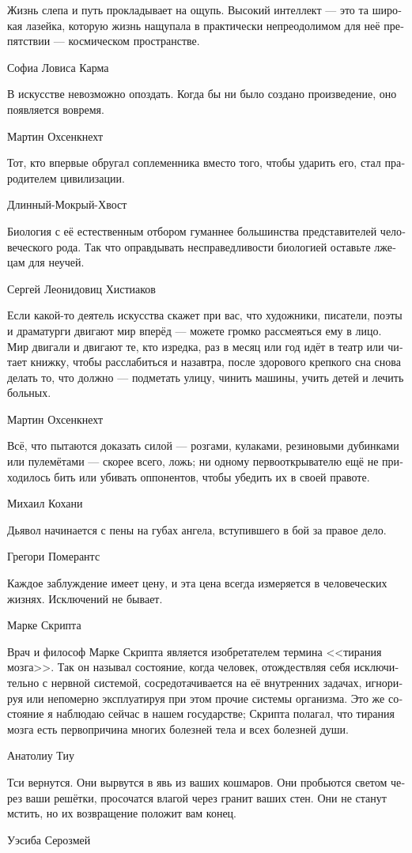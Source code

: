 \documentclass[a4paper,12pt,fleqn]{book}\usepackage{polyglossia}\setdefaultlanguage[babelshorthands=true]{russian}\setotherlanguage{english}\defaultfontfeatures{Ligatures=TeX,Mapping=tex-text}\usepackage{xcolor}\newcommand{\ml}[3]{#2}
\begin{document}
{\epigraph
{Жизнь слепа и путь прокладывает на ощупь.
Высокий интеллект --- это та широкая лазейка, которую жизнь нащупала в практически непреодолимом для неё препятствии --- космическом пространстве.}
{Софиа Ловиса Карма}

\epigraph
{В искусстве невозможно опоздать.
Когда бы ни было создано произведение, оно появляется вовремя.}
{Мартин Охсенкнехт}

\epigraph
{Тот, кто впервые обругал соплеменника вместо того, чтобы ударить его, стал прародителем цивилизации.}
{Длинный-Мокрый-Хвост}

\epigraph
{Биология с её естественным отбором гуманнее большинства представителей человеческого рода.
Так что оправдывать несправедливости биологией оставьте лжецам для неучей.}
{Сергей Леонидовиц Хистиаков}

\epigraph
{Если какой-то деятель искусства скажет при вас, что художники, писатели, поэты и драматурги двигают мир вперёд --- можете громко рассмеяться ему в лицо.
Мир двигали и двигают те, кто изредка, раз в месяц или год идёт в театр или читает книжку, чтобы расслабиться и назавтра, после здорового крепкого сна снова делать то, что должно --- подметать улицу, чинить машины, учить детей и лечить больных.}
{Мартин Охсенкнехт}

\epigraph
{Всё, что пытаются доказать силой --- розгами, кулаками, резиновыми дубинками или пулемётами --- скорее всего, ложь;
ни одному первооткрывателю ещё не приходилось бить или убивать оппонентов, чтобы убедить их в своей правоте.}
{Михаил Кохани}

\epigraph
{Дьявол начинается с пены на губах ангела, вступившего в бой за правое дело.}
{Грегори Померантс}

\epigraph
{Каждое заблуждение имеет цену, и эта цена всегда измеряется в человеческих жизнях.
Исключений не бывает.}
{Марке Скрипта}

\epigraph
{Врач и философ Марке Скрипта является изобретателем термина <<тирания мозга>>.
Так он называл состояние, когда человек, отождествляя себя исключительно с нервной системой, сосредотачивается на её внутренних задачах, игнорируя или непомерно эксплуатируя при этом прочие системы организма.
Это же состояние я наблюдаю сейчас в нашем государстве;
Скрипта полагал, что тирания мозга есть первопричина многих болезней тела и всех болезней души.}
{Анатолиу Тиу}

\epigraph
{Тси вернутся.
Они вырвутся в явь из ваших кошмаров.
Они пробьются светом через ваши решётки, просочатся влагой через гранит ваших стен.
Они не станут мстить, но их возвращение положит вам конец.}
{Уэсиба Серозмей}

}
\end{document}
